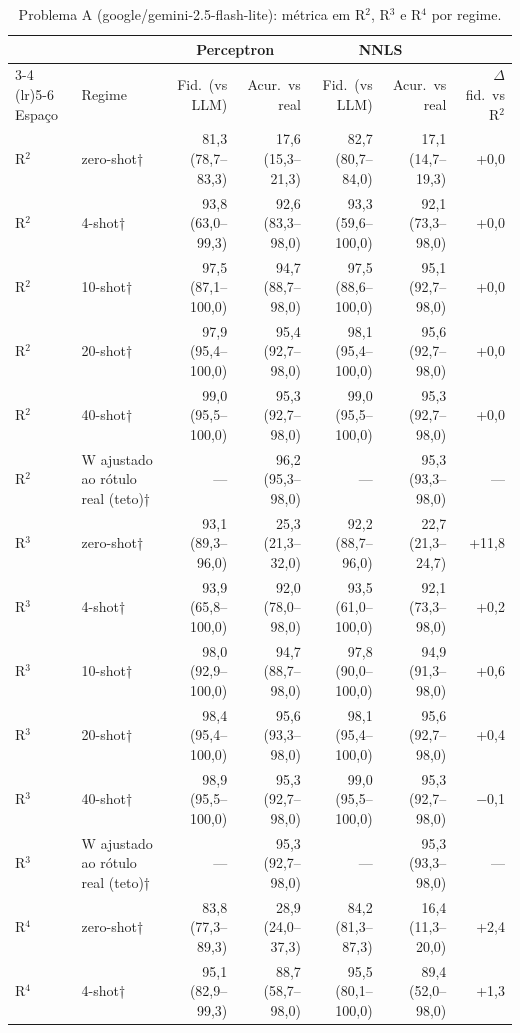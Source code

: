 \begin{table}[htbp]
\centering
\small
\caption{Problema A (google/gemini-2.5-flash-lite): métrica em R$^2$, R$^3$ e R$^4$ por regime.}
\label{tab:bloco1_A_R2_R3_R4_zero_fewshot_flashlite}
\begin{tabular}{llrrrrr}
\toprule
 &  & \multicolumn{2}{c}{Perceptron} & \multicolumn{2}{c}{NNLS} &  \\ \cmidrule(lr){3-4} \cmidrule(lr){5-6}
Espaço & Regime & Fid.\ (vs LLM) & Acur.\ vs real & Fid.\ (vs LLM) & Acur.\ vs real & $\Delta$ fid.\ vs R$^2$ \\
\midrule
R$^2$ & zero-shot† & 81,3 (78,7–83,3) & 17,6 (15,3–21,3) & 82,7 (80,7–84,0) & 17,1 (14,7–19,3) & +0,0 \\
R$^2$ & 4-shot† & 93,8 (63,0–99,3) & 92,6 (83,3–98,0) & 93,3 (59,6–100,0) & 92,1 (73,3–98,0) & +0,0 \\
R$^2$ & 10-shot† & 97,5 (87,1–100,0) & 94,7 (88,7–98,0) & 97,5 (88,6–100,0) & 95,1 (92,7–98,0) & +0,0 \\
R$^2$ & 20-shot† & 97,9 (95,4–100,0) & 95,4 (92,7–98,0) & 98,1 (95,4–100,0) & 95,6 (92,7–98,0) & +0,0 \\
R$^2$ & 40-shot† & 99,0 (95,5–100,0) & 95,3 (92,7–98,0) & 99,0 (95,5–100,0) & 95,3 (92,7–98,0) & +0,0 \\
R$^2$ & W ajustado ao rótulo real (teto)† & — & 96,2 (95,3–98,0) & — & 95,3 (93,3–98,0) & — \\
\midrule
R$^3$ & zero-shot† & 93,1 (89,3–96,0) & 25,3 (21,3–32,0) & 92,2 (88,7–96,0) & 22,7 (21,3–24,7) & +11,8 \\
R$^3$ & 4-shot† & 93,9 (65,8–100,0) & 92,0 (78,0–98,0) & 93,5 (61,0–100,0) & 92,1 (73,3–98,0) & +0,2 \\
R$^3$ & 10-shot† & 98,0 (92,9–100,0) & 94,7 (88,7–98,0) & 97,8 (90,0–100,0) & 94,9 (91,3–98,0) & +0,6 \\
R$^3$ & 20-shot† & 98,4 (95,4–100,0) & 95,6 (93,3–98,0) & 98,1 (95,4–100,0) & 95,6 (92,7–98,0) & +0,4 \\
R$^3$ & 40-shot† & 98,9 (95,5–100,0) & 95,3 (92,7–98,0) & 99,0 (95,5–100,0) & 95,3 (92,7–98,0) & $-$0,1 \\
R$^3$ & W ajustado ao rótulo real (teto)† & — & 95,3 (92,7–98,0) & — & 95,3 (93,3–98,0) & — \\
\midrule
R$^4$ & zero-shot† & 83,8 (77,3–89,3) & 28,9 (24,0–37,3) & 84,2 (81,3–87,3) & 16,4 (11,3–20,0) & +2,4 \\
R$^4$ & 4-shot† & 95,1 (82,9–99,3) & 88,7 (58,7–98,0) & 95,5 (80,1–100,0) & 89,4 (52,0–98,0) & +1,3 \\

\end{tabular}
\end{table}
